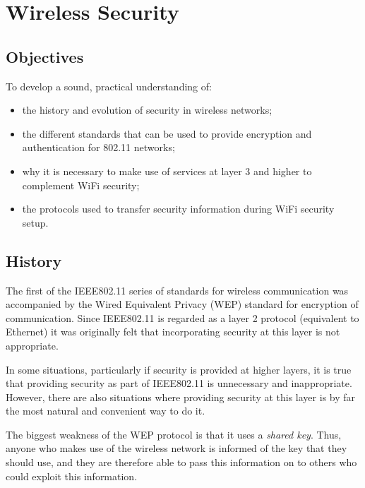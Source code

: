 \chapter{Wireless Security}\label{security}

\minitoc 

\clearpage
\section*{Objectives}
To develop a sound, practical understanding of:
\begin{itemize}

\item the history and evolution of security in wireless networks;

\item the different standards that can be used to provide encryption and authentication for 802.11 networks;

\item why it is necessary to make use of services at layer 3 and higher to complement WiFi security;

\item the protocols used to transfer security information during WiFi security setup.

\end{itemize}


\section{History}
The first of the IEEE802.11 series of standards for wireless
communication was accompanied by the Wired Equivalent Privacy (WEP)
standard for encryption of communication. Since IEEE802.11 is regarded
as a layer 2 protocol (equivalent to Ethernet) it was originally felt
that incorporating security at this layer is not appropriate.

In some situations, particularly if security is provided at higher layers,
it is true that providing security as part of IEEE802.11 is unnecessary
and inappropriate. However, there are also situations where providing
security at this layer is by far the most natural and convenient way to
do it.

The biggest weakness of the WEP protocol is that it uses a {\em shared
key}. Thus, anyone who makes use of the wireless network is informed of
the key that they should use, and they are therefore able to pass this
information on to others who could exploit this information.

